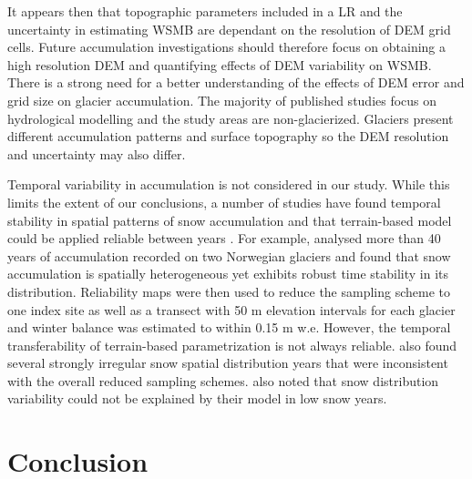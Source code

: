 \documentclass[twocolumn,letterpaper]{igs}
\begin{document}
It appears then that topographic parameters included in a LR and the uncertainty in estimating WSMB are dependant on the resolution of DEM grid cells. Future accumulation investigations should therefore focus on obtaining a high resolution DEM and quantifying effects of DEM variability on WSMB. There is a strong need for a better understanding of the effects of DEM error and grid size on glacier accumulation. The majority of published studies focus on hydrological modelling and the study areas are non-glacierized. Glaciers present different accumulation patterns and surface topography so the DEM resolution and uncertainty may also differ.

Temporal variability in accumulation is not considered in our study. While this limits the extent of our conclusions, a number of studies have found temporal stability in spatial patterns of snow accumulation and that terrain-based model could be applied reliable between years \citep[e.g.][]{Grunewald2013}. For example, \cite{Walmsley2015} analysed more than 40 years of accumulation recorded on two Norwegian glaciers and found that snow accumulation is spatially heterogeneous yet exhibits robust time stability in its distribution. Reliability maps were then used to reduce the sampling scheme to one index site as well as a transect with 50 m elevation intervals for each glacier and winter balance was estimated to within 0.15 m w.e. However, the temporal transferability of terrain-based parametrization is not always reliable. \cite{Walmsley2015} also found several strongly irregular snow spatial distribution years that were inconsistent with the overall reduced sampling schemes. \cite{Revuelto2014} also noted that snow distribution variability could not be explained by their model in low snow years.


\section{Conclusion}
\end{document}
